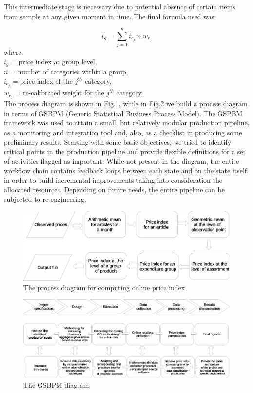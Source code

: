 \documentclass[]{article}
\begin{document}
This intermediate stage is necessary due to potential absence of certain items from sample at any given moment in time, 
The final formula used was:

\begin{equation}\label{eq:8}
	i_{g} = \sum_{j=1}^{n} i_{c_{j}} \times w_{r_{j}}
\end{equation}
where:\\
$i_{g}$ = price index at group level, \\
$n$ = number of categories within a group, \\
$i_{c_{j}}$ = price index of the $j^{th}$ category, \\
$w_{r_{j}}$ = re-calibrated weight for the $j^{th}$ category.\\


The process diagram is shown in Fig.\ref{fig:2}, while in Fig.\ref{fig:3} we build a process diagram in terms of GSBPM (Generic Statistical Business Process Model)\cite{gsbpm}. The GSPBM framework was used to attain a small, but relatively modular production pipeline, as a monitoring and integration tool and, also, as a checklist in producing some preliminary results. Starting with some basic objectives, we tried to identify critical points in the production pipeline and provide flexible definitions for a set of activities flagged as important. While not present in the diagram, the entire workflow chain contains feedback loops between each state and on the state itself, in order to build incremental improvements taking into consideration the allocated resources. Depending on future needs, the entire pipeline can be subjected to re-engineering.      


\begin{figure}
\centering
\includegraphics[width=0.8\linewidth]{fig1.eps}
\caption{The process diagram for computing online price index}
\label{fig:2}
\end{figure}


\begin{figure}
\centering
\includegraphics[width=1\linewidth]{fig2.eps}
\caption{The GSBPM diagram}
\label{fig:3}
\end{figure}
\end{document}
